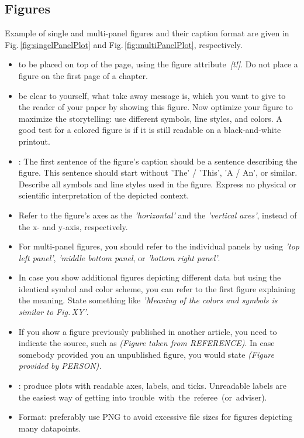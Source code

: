 \subsection*{Figures}
\noindent
Example of single and multi-panel figures and their caption format are given in Fig.\,\ref{fig:singelPanelPlot} and Fig.\,\ref{fig:multiPanelPlot}, respectively.
\begin{itemize}

    \item {} to be placed on top of the page, using the figure attribute~\textit{[t!]}. Do not place a figure on the first page of a chapter.

    \item {} be clear to yourself, what take away message is, which you want to give to the reader of your paper by showing this figure. Now optimize your figure to maximize the storytelling: use different symbols, line styles, and colors. A good test for a colored figure is if it is still readable on a black-and-white printout.

    \item {}: The first sentence of the figure's caption should be a sentence describing the figure. This sentence should start without 'The' / 'This', 'A / An',  or similar.
    Describe all symbols and line styles used in the figure. Express no physical or scientific interpretation of the depicted context.
    
    \item Refer to the figure's axes as the \textit{'horizontal'} and the \textit{'vertical axes'}, instead of the x- and y-axis, respectively.
    
    \item For multi-panel figures, you should refer to the individual panels by using \textit{'top left panel'}, \textit{'middle bottom panel}, or \textit{'bottom right panel'}. 
    
    \item In case you show additional figures depicting different data but using the identical symbol and color scheme, you can refer to the first figure explaining the meaning. State something like \textit{'Meaning of the colors and symbols is similar to Fig.\,XY'}.
        
    \item If you show a figure previously published in another article, you need to indicate the source, such as \textit{(Figure taken from REFERENCE)}. In case somebody provided you  an unpublished figure, you would state  \textit{(Figure provided by PERSON).}    
    
    \item {}: produce plots with readable axes, labels, and ticks. Unreadable labels are the easiest way of getting into \hbox{trouble with the referee (or adviser).}
    

    \item Format: preferably use PNG to avoid excessive file sizes for figures depicting many datapoints.
    

    
\end{itemize}

